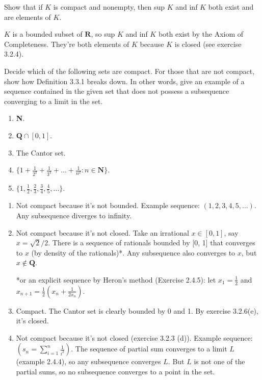 \documentclass{oxmathproblems}
\begin{document}
\begin{questions}

\miquestion Show that if $K$ is compact and nonempty, then sup $K$ and inf $K$ both exist and are elements of $K$.
\begin{solution}
  $K$ is a bounded subset of $\textbf{R}$, so sup $K$ and inf $K$ both exist by the Axiom of Completeness. They're both
  elements of $K$ because $K$ is closed (see exercise 3.2.4).
\end{solution}

\miquestion Decide which of the following sets are compact. For those that are not compact, show how Definition 3.3.1 breaks down. In other words, give an example
of a sequence contained in the given set that does not possess a subsequence converging to a limit in the set.
\begin{enumerate}[label=(\alph*)]
  \item \textbf{N}.
  \item $\textbf{Q} \cap [0, 1]$.
  \item The Cantor set.
  \item $\{1 + \frac{1}{2^2} +  \frac{1}{3^2} + ... + \frac{1}{n^2} : n \in \textbf{N}\}$.
  \item $\{1, \frac{1}{2}, \frac{2}{3}, \frac{3}{4}, \frac{4}{5}, ...\}$.
\end{enumerate}

\begin{solution}
  \begin{enumerate}[label=(\alph*)]
    \item Not compact because it's not bounded. Example sequence: $(1, 2, 3, 4, 5, ...)$. Any subsequence diverges to infinity.
    \item Not compact because it's not closed. Take an irrational $x \in [0, 1]$, say $x = \sqrt{2}/2$. There is a sequence of rationals bounded
    by [0, 1] that converges to $x$ (by density of the rationals)*. Any subsequence also converges to $x$, but $x \notin \textbf{Q}$.

    *or an explicit sequence by Heron's method (Exercise 2.4.5): let $x_{1} = \frac{1}{2}$ and $x_{n+1}=\frac{1}{2}(x_{n}+\frac{1}{2x_{n}})$.

    \item Compact. The Cantor set is clearly bounded by 0 and 1. By exercise 3.2.6(e), it's closed.

    \item Not compact because it's not closed (exercise 3.2.3 (d)). Example sequence: $(s_{n} = \sum_{i=1}^{n}\frac{1}{i^{2}})$. The sequence of partial sum
    converges to a limit $L$ (example 2.4.4), so any subsequence converges $L$. But $L$ is not one of the partial sums, so no subsequence
    converges to a point in the set.


\end{enumerate}
\end{solution}
\end{questions}
\end{document}

